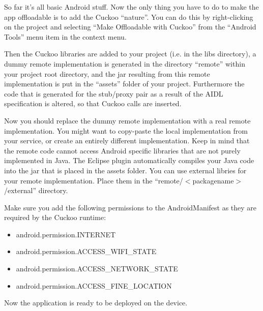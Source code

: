 \documentclass{article}
\begin{document}
So far it's all basic Android stuff. Now the only thing you have to do to make
the app offloadable is to add the Cuckoo ``nature''. You can do this by
right-clicking on the project and selecting ``Make Offloadable with Cuckoo''
from the ``Android Tools'' menu item in the context menu.

Then the Cuckoo libraries are added to your project (i.e. in the libs
directory), a dummy remote implementation is generated in the directory
``remote'' within your project root directory, and the jar resulting from this
remote implementation is put in the ``assets'' folder of your project. Furthermore the
code that is generated for the stub/proxy pair as a result of the AIDL
specification is altered, so that Cuckoo calls are inserted.

Now you should replace the dummy remote implementation with a real remote
implementation. You might want to copy-paste the local implementation from your
service, or create an entirely different implementation. Keep in mind that the
remote code cannot access Android specific libraries that are not purely
implemented in Java. The Eclipse plugin automatically compiles your Java code
into the jar that is placed in the assets folder. You can use external libries
for your remote implementation. Place them in the
``remote/$<$packagename$>$/external'' directory.

Make sure you add the following permissions to the AndroidManifest as they are
required by the Cuckoo runtime:

\begin{itemize}
\item  android.permission.INTERNET
\item  android.permission.ACCESS\_WIFI\_STATE
\item  android.permission.ACCESS\_NETWORK\_STATE
\item  android.permission.ACCESS\_FINE\_LOCATION
\end{itemize}

Now the application is ready to be deployed on the device.
\end{document}
